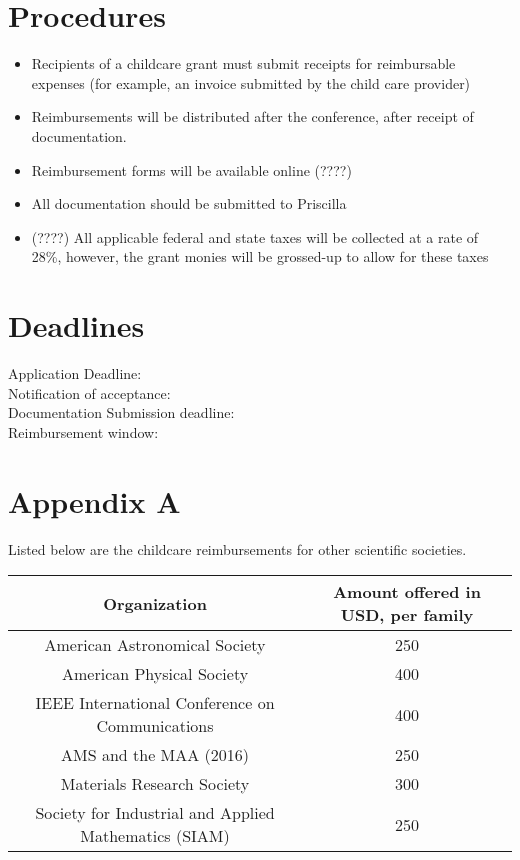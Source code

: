 \documentclass[11pt,letterpaper]{article}
\begin{document}
\section*{Procedures}
\begin{itemize}


\item Recipients of a childcare grant must submit receipts for reimbursable expenses (for example, an invoice submitted by the child care provider)
\item Reimbursements will be distributed after the conference, after receipt of documentation.
\item Reimbursement forms will be available online (????)
\item All documentation should be submitted to Priscilla 
\item (????) All applicable federal and state taxes will be collected at a rate of 28\%, however, the grant monies will be grossed-up to allow for these taxes
 
 \end{itemize}

\section*{Deadlines}

Application Deadline:  \\
Notification of acceptance: \\
Documentation Submission deadline:  \\
Reimbursement window: \\


\pagebreak
\section{Appendix A}
\nocite{STEMTravelgrant}

Listed below are the childcare reimbursements for other scientific societies. \\

\begin{tabular}{|c|c|} \hline
 Organization &  Amount offered in USD, per family \\ \hline
  American Astronomical Society\cite{AmericanAstronomicalSociety} & 250  \\ \hline
   American Physical Society \cite{AmericanPhysicalSociety} & 400 \\ \hline
   IEEE International Conference on Communications\cite{IEEEInternationalConference} & 400 \\ \hline
   AMS and the MAA (2016)\cite{AmericanMathematicalSociety}  & 250 \\ \hline
   Materials Research Society\cite{MaterialsResearchSociety} & 300 \\ \hline
   Society for Industrial and Applied Mathematics (SIAM)\cite{SocietyIndustrialApplied} & 250 \\ \hline 
   
\end{tabular}





\end{document}
